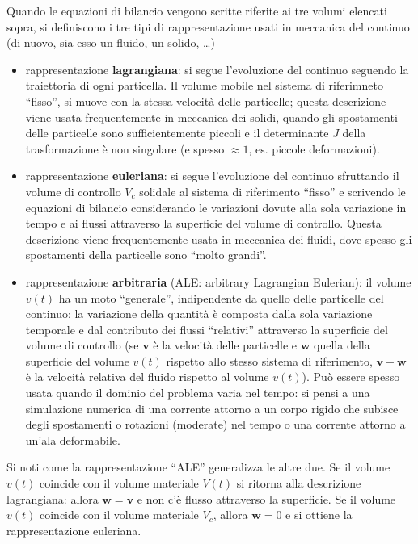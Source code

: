 Quando le equazioni di bilancio vengono scritte riferite ai tre volumi elencati sopra, si definiscono i tre tipi di rappresentazione usati in meccanica
 del continuo (di nuovo, sia esso un fluido, un solido, \dots)

\begin{itemize}
 \item rappresentazione \textbf{lagrangiana}: si segue l'evoluzione del continuo seguendo la traiettoria di ogni particella. Il volume mobile nel sistema
       di riferimneto ``fisso'', si muove con la stessa velocità delle particelle; questa descrizione viene usata frequentemente in meccanica dei solidi,
       quando gli spostamenti delle particelle sono sufficientemente piccoli e il determinante $J$ della trasformazione è non singolare (e spesso $\approx
       1$, es. piccole deformazioni).
 \item rappresentazione \textbf{euleriana}: si segue l'evoluzione del continuo sfruttando il volume di controllo $V_c$ solidale al sistema di 
       riferimento ``fisso'' e scrivendo le equazioni di bilancio considerando le variazioni dovute alla sola variazione in tempo e ai flussi attraverso
       la superficie del volume di controllo. Questa descrizione viene frequentemente usata in meccanica dei fluidi, dove spesso gli spostamenti della
       particelle sono ``molto grandi''. 
 \item rappresentazione \textbf{arbitraria} (ALE: arbitrary Lagrangian Eulerian): il volume $v(t)$ ha un moto ``generale'', indipendente da quello delle 
       particelle del continuo: la variazione della quantità è composta dalla sola variazione temporale e dal contributo dei flussi ``relativi'' 
       attraverso la superficie del volume di controllo (se $\bm{v}$ è la velocità delle particelle e $\bm{w}$ quella della superficie del volume $v(t)$
       rispetto allo stesso sistema di riferimento, $\bm{v} - \bm{w}$ è la velocità relativa del fluido rispetto al volume $v(t)$).
       Può essere spesso usata quando il dominio del problema varia nel tempo: si pensi a una simulazione numerica di una corrente attorno a un corpo
       rigido che subisce degli spostamenti o rotazioni (moderate) nel tempo o una corrente attorno a un'ala deformabile.
\end{itemize}

\noindent
Si noti come la rappresentazione ``ALE'' generalizza le altre due. Se il volume $v(t)$ coincide con il volume materiale $V(t)$ si ritorna alla descrizione
 lagrangiana: allora $\bm{w}=\bm{v}$ e non c'è flusso attraverso la superficie. Se il volume $v(t)$ coincide con il volume materiale $V_c$, allora $\bm{w}
 =0$ e si ottiene la rappresentazione euleriana.



